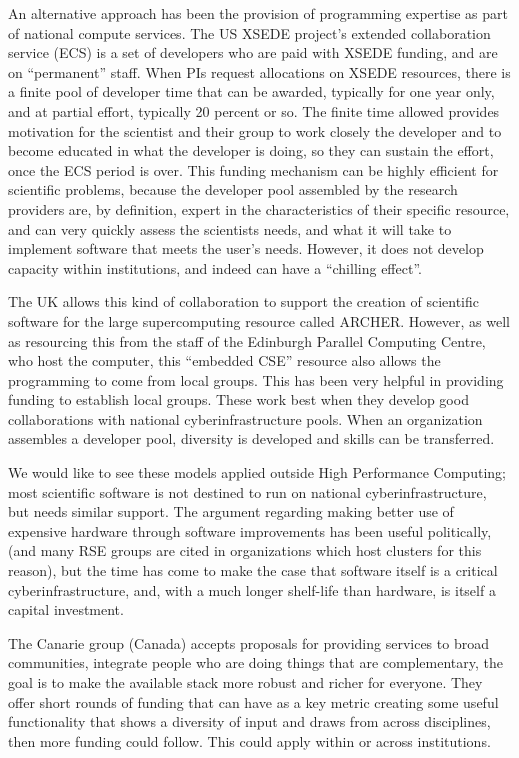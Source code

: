 An alternative approach has been the provision of programming expertise as
part of national compute services. The US XSEDE project's extended collaboration
 service (ECS) is a set of developers who are paid with XSEDE funding,
 and are on “permanent” staff.  When PIs request allocations on XSEDE resources,
 there is a finite pool of developer time that can be awarded,
typically for one year only, and at partial effort, typically 20 percent or so.
The finite time allowed provides motivation for the scientist and their group to
work closely the developer and to become educated in what the developer is doing,
so they can sustain the effort, once the ECS period is over. This funding
mechanism can be highly efficient for scientific problems, because the developer
pool assembled by the research providers are, by definition, expert in the
characteristics of their specific resource, and can very quickly assess the
scientists needs, and what it will take to implement software that meets the
user’s needs. However, it does not develop capacity within institutions,
and indeed can have a ``chilling effect''.

The UK allows this kind of collaboration to support the creation of scientific
software for the large supercomputing resource called ARCHER.
However, as well as resourcing this from the staff of the Edinburgh Parallel
Computing Centre, who host the computer, this ``embedded CSE'' resource also
allows the programming to come from local groups. This has been very helpful
in providing funding to establish local groups. These work best when they
develop good collaborations with national cyberinfrastructure pools.
When an organization assembles
a developer pool, diversity is developed and skills can be transferred.

We would like to see these models applied outside High Performance Computing;
most scientific software is not destined to run on national cyberinfrastructure,
but needs similar support. The argument regarding making better use of expensive
hardware through software improvements has been useful politically, (and many
RSE groups are cited in organizations which host clusters for this reason), but
the time has come to make the case that software itself is a critical
cyberinfrastructure, and, with a much longer shelf-life than hardware, is itself
a capital investment.

The Canarie group (Canada) accepts proposals
for providing services to broad communities, integrate people who are doing
things that are complementary, the goal is to make the available stack more
robust and richer for everyone. They offer short rounds of funding that can
have as a key metric creating some useful functionality that shows a diversity
of input and draws from across disciplines, then more funding could follow. This
could apply within or across institutions.


